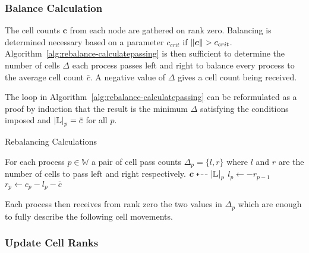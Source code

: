 \documentclass[twoside]{IIBproject}
\newcommand{\vect} [1] {\bm{#1}}
\newcommand{\dla}{\dashleftarrow}
\numberwithin{figure}{section}
\begin{document}
        \subsubsection{Balance Calculation} %
            \label{sec:rebalancing-calc}

            The cell counts $\vect{c}$ from each node are gathered on rank zero. Balancing is determined necessary based on a parameter $c_{crit}$ if $\norm{\vect{c}}>c_{crit}$. Algorithm~\ref{alg:rebalance-calculatepassing} is then sufficient to determine the number of cells $\Delta$ each process passes left and right to balance every process to the average cell count $\bar c$. A negative value of $\Delta$ gives a cell count being received.

            The loop in Algorithm~\ref{alg:rebalance-calculatepassing} can be reformulated as a proof by induction that the result is the minimum $\Delta$ satisfying the conditions imposed and $\abs{\mathbb{L}}_p=\bar c$ for all $p$.

            \begin{algorithm}[H]
                \caption{Rebalancing Calculations}
                \label{alg:rebalance-calculatepassing}

                \begin{algorithmic}
                    \Ensure For each process $p \in \mathbb{W}$ a pair of cell pass counts $\Delta_p = \{l,r\}$ where $l$ and $r$ are the number of cells to pass left and right respectively.
                    \Statex
                    \Gather $\vect{c} \dla \abs{\mathbb{L}}_p $
                        \State $l_p \gets -r_{p-1}$
                        \State $r_p \gets c_p - l_p - \bar{c}$
                    \EndFor
                \end{algorithmic}
            \end{algorithm}

            Each process then receives from rank zero the two values in $\Delta_p$ which are enough to fully describe the following cell movements.



        \subsubsection{Update Cell Ranks} %
            \label{sec:rebalancing-updatecellranks}
\end{document}
